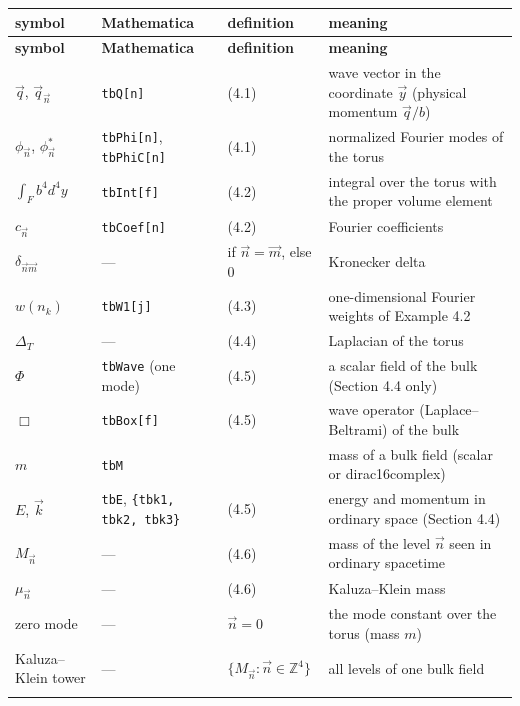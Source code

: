 \documentclass[10pt,a4paper]{article}
\begin{document}
{\small
\begin{longtable}{>{\raggedright\arraybackslash}p{}>{\raggedright\arraybackslash}p{}>{\raggedright\arraybackslash}p{}>{\raggedright\arraybackslash}p{}}
\toprule
\textbf{symbol} & \textbf{Mathematica} & \textbf{definition} & \textbf{meaning} \\
\midrule\endfirsthead
\toprule
\textbf{symbol} & \textbf{Mathematica} & \textbf{definition} & \textbf{meaning} \\
\midrule\endhead
\endfoot
\bottomrule\endlastfoot
$\vec q$, $\vec q_{\vec n}$ & \texttt{tbQ[n]} & (4.1) & wave vector in the coordinate $\vec y$ (physical momentum $\vec q/b$) \\
$\phi_{\vec n}$, $\phi^*_{\vec n}$ & \texttt{tbPhi[n]}, \texttt{tbPhiC[n]} & (4.1) & normalized Fourier modes of the torus \\
$\int_Fb^4d^4y$ & \texttt{tbInt[f]} & (4.2) & integral over the torus with the proper volume element \\
$c_{\vec n}$ & \texttt{tbCoef[n]} & (4.2) & Fourier coefficients \\
$\delta_{\vec n\vec m}$ & — & 1 if $\vec n=\vec m$, else 0 & Kronecker delta \\
$w(n_k)$ & \texttt{tbW1[j]} & (4.3) & one-dimensional Fourier weights of Example 4.2 \\
$\Delta_T$ & — & (4.4) & Laplacian of the torus \\
$\Phi$ & \texttt{tbWave} (one mode) & (4.5) & a scalar field of the bulk (Section 4.4 only) \\
$\Box$ & \texttt{tbBox[f]} & (4.5) & wave operator (Laplace–Beltrami) of the bulk \\
$m$ & \texttt{tbM} &  & mass of a bulk field (scalar or dirac16complex) \\
$E$, $\vec k$ & \texttt{tbE}, \texttt{\{tbk1, tbk2, tbk3\}} & (4.5) & energy and momentum in ordinary space (Section 4.4) \\
$M_{\vec n}$ & — & (4.6) & mass of the level $\vec n$ seen in ordinary spacetime \\
$\mu_{\vec n}$ & — & (4.6) & Kaluza–Klein mass \\
zero mode & — & $\vec n=0$ & the mode constant over the torus (mass $m$) \\
Kaluza–Klein tower & — & $\{M_{\vec n}:\vec n\in\mathbb Z^4\}$ & all levels of one bulk field \\*
\end{longtable}}
\end{document}
